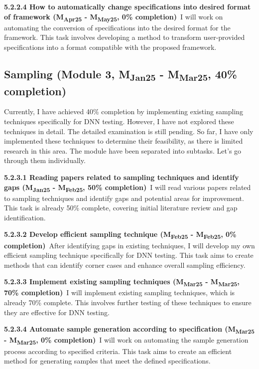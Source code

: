 \noindent \textbf{5.2.2.4 How to automatically change specifications into desired format of framework (M\textsubscript{Apr25} - M\textsubscript{May25}, 0\% completion)}\ I will work on automating the conversion of specifications into the desired format for the framework. This task involves developing a method to transform user-provided specifications into a format compatible with the proposed framework.



\subsection{Sampling (Module 3, M\textsubscript{Jan25} - M\textsubscript{Mar25}, 40\% completion)} Currently, I have achieved 40\% completion by implementing existing sampling techniques specifically for DNN testing. However, I have not explored these techniques in detail. The detailed examination is still pending. So far, I have only implemented these techniques to determine their feasibility, as there is limited research in this area. The module have been separated into subtasks. Let's go through them individually.

\noindent \textbf{5.2.3.1 Reading papers related to sampling techniques and identify gaps (M\textsubscript{Jan25} - M\textsubscript{Feb25}, 50\% completion)}\  I will read various papers related to sampling techniques and identify gaps and potential areas for improvement. This task is already 50\% complete, covering initial literature review and gap identification.

\noindent \textbf{5.2.3.2 Develop efficient sampling technique (M\textsubscript{Feb25} - M\textsubscript{Feb25}, 0\% completion)}\ After identifying gaps in existing techniques, I will develop my own efficient sampling technique specifically for DNN testing. This task aims to create methods that can identify corner cases and enhance overall sampling efficiency.

\noindent \textbf{5.2.3.3 Implement existing sampling techniques (M\textsubscript{Mar25} - M\textsubscript{Mar25}, 70\% completion)}\ I will implement existing sampling techniques, which is already 70\% complete. This involves further testing of these techniques to ensure they are effective for DNN testing.

\noindent \textbf{5.2.3.4 Automate sample generation according to specification (M\textsubscript{Mar25} - M\textsubscript{Mar25}, 0\% completion)}\ I will work on automating the sample generation process according to specified criteria. This task aims to create an efficient method for generating samples that meet the defined specifications.

